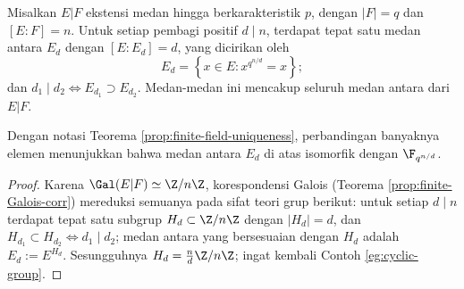 \begin{theorem}\label{prop:finite-field-subext}
	Misalkan $E|F$ ekstensi medan hingga berkarakteristik $p$, dengan $|F|=q$ dan $[E:F]=n$. Untuk setiap pembagi positif $d\mid n$, terdapat tepat satu medan antara $E_d$ dengan $[E:E_d]=d$, yang dicirikan oleh
	\[ E_d = \left\{ x \in E: x^{q^{n/d}} = x \right\}; \]
	dan $d_1\mid d_2\iff E_{d_1}\supset E_{d_2}$. Medan-medan ini mencakup seluruh medan antara dari $E|F$.
\end{theorem}
Dengan notasi Teorema \ref{prop:finite-field-uniqueness}, perbandingan banyaknya elemen menunjukkan bahwa medan antara $E_d$ di atas isomorfik dengan $\F_{q^{n/d}}$.
\begin{proof}
	Karena $\Gal(E|F) \simeq \Z/n\Z$, korespondensi Galois (Teorema \ref{prop:finite-Galois-corr}) mereduksi semuanya pada sifat teori grup berikut: untuk setiap $d \mid n$ terdapat tepat satu subgrup $H_d \subset \Z/n\Z$ dengan $|H_d|=d$, dan $H_{d_1} \subset H_{d_2} \iff d_1 \mid d_2$; medan antara yang bersesuaian dengan $H_d$ adalah $E_d := E^{H_d}$. Sesungguhnya $H_d = \frac{n}{d}\Z / n\Z$; ingat kembali Contoh \ref{eg:cyclic-group}.
\end{proof}

